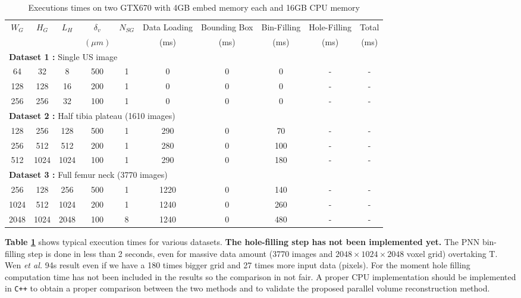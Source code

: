 \documentclass[12pt,journal,compsoc]{IEEEtran}
\begin{document}
\begin{table}[!ht]
\renewcommand{\arraystretch}{1.3}
\caption{Executions times on two GTX670 with 4GB embed memory each and 16GB CPU memory}
\label{results_gtx670}
\centering
\begin{tabular}{|c|c|c||c|c||c|c|c|c||c|}
\hline
$W_G$ & $H_G$ & $L_H$ & $\delta_v$ & $N_{SG}$ & Data Loading & Bounding Box & Bin-Filling & Hole-Filling & Total \\
      &&&$(\mu m)$&&(ms)&(ms)&(ms)&(ms)&(ms)\\
\hline
\multicolumn{10}{|l|}{\textbf{Dataset 1 :} Single US image}\\
\hline
64&32&8&500&1&0&0&0&-&-\\
\hline
128&128&16&200&1&0&0&0&-&-\\
\hline
256&256&32&100&1&0&0&0&-&-\\
\hline
\hline
\multicolumn{10}{|l|}{\textbf{Dataset 2 :} Half tibia plateau (1610 images)}\\
\hline
128&256&128&500&1&290&0&70&-&-\\
\hline
256&512&512&200&1&280&0&100&-&-\\
\hline
512&1024&1024&100&1&290&0&180&-&-\\
\hline
\hline
\multicolumn{10}{|l|}{\textbf{Dataset 3 :} Full femur neck (3770 images)}\\
\hline
256&128&256&500&1&1220&0&140&-&-\\
\hline
1024&512&1024&200&1&1240&0&260&-&-\\
\hline
2048&1024&2048&100&8&1240&0&480&-&-\\
\hline
\end{tabular}
\end{table}

\textbf{Table \ref{results_gtx670}} shows typical execution times for various datasets.
\textbf{The hole-filling step has not been implemented yet.} The PNN bin-filling step is done in less than 2 seconds, even for massive data amount (3770 images and $2048\times1024\times2048$ voxel grid) overtaking T. Wen \textit{et al.}\textbf{\cite{2}} 94s result even if we have a 180 times bigger grid and 27 times more input data (pixels). For the moment hole filling computation time has not been included in the results so the comparison in not fair. A proper CPU implementation should be implemented in \texttt{C++} to obtain a proper comparison between the two methods and to validate the proposed parallel volume reconstruction method.\par
\end{document}
